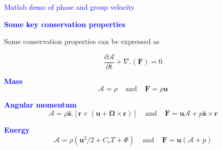 \documentclass[a4]{seminar}
\newcommand{\B}[1]{\textcolor{blue}{#1}}
\begin{document}
\begin{slide}

\begin{center}
\B{Matlab demo of phase and group velocity}
\end{center}

\end{slide}


\begin{slide}

\B{\bf Some key conservation properties}

\vspace{3mm}

Some conservation properties can be expressed as

\begin{displaymath}
\frac{\partial \mathcal{A}}{\partial t}  + \nabla . (\mathbf{F})= 0
\end{displaymath}


\vspace{2mm}

\B{\bf Mass}
\begin{displaymath}
\mathcal{A} = \rho \ \ \ \ \ 
\mathrm{and} \ \ \ \ \  \mathbf{F} = \rho \mathbf{u}
\end{displaymath}

\vspace{2mm}

\B{\bf Angular momentum}
\begin{displaymath}
\mathcal{A} = \rho \widehat{\mathbf{z}}.\left[ \mathbf{r}\times
\left( \mathbf{u}+\boldsymbol{\Omega} \times \mathbf{r}\right) \right] \ \ \ \ \ 
\mathrm{and} \ \ \ \ \   
\mathbf{F} = \mathbf{u} \mathcal{A}+p\widehat{\mathbf{z}}\times \mathbf{r}
\end{displaymath}

\vspace{2mm}

\B{\bf Energy}
\begin{displaymath}
\mathcal{A} = \rho (\mathbf{u}^2 / 2 + C_v T + \Phi) \ \ \ \ \ 
\mathrm{and} \ \ \ \ \ 
\mathbf{F} = \mathbf{u}(\mathcal{A} + p)
\end{displaymath}




\end{slide}

\end{document}
